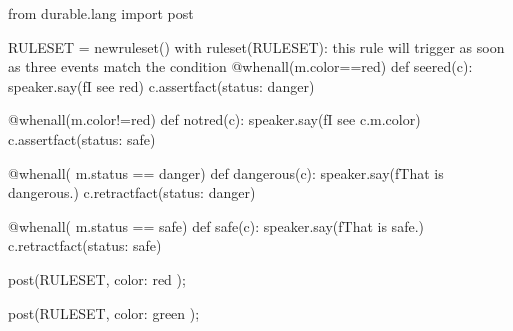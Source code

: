\documentclass[letterpaper,10pt,english]{sphinxmanual}
\begin{document}
{
\begin{sphinxVerbatim}[commandchars=\\\{\}]
\llap{\color{nbsphinxin}[ ]:\,\hspace{\fboxrule}\hspace{\fboxsep}}from durable.lang import post

RULESET = new\PYGZus{}ruleset()
with ruleset(RULESET):
    \PYGZsh{} this rule will trigger as soon as three events match the condition
    @when\PYGZus{}all(m.color==\PYGZsq{}red\PYGZsq{})
    def see\PYGZus{}red(c):
        speaker.say(f\PYGZsq{}I see red\PYGZsq{})
        c.assert\PYGZus{}fact(\PYGZob{}\PYGZsq{}status\PYGZsq{}: \PYGZsq{}danger\PYGZsq{}\PYGZcb{})

    @when\PYGZus{}all(m.color!=\PYGZsq{}red\PYGZsq{})
    def not\PYGZus{}red(c):
        speaker.say(f\PYGZsq{}I see \PYGZob{}c.m.color\PYGZcb{}\PYGZsq{})
        c.assert\PYGZus{}fact(\PYGZob{}\PYGZsq{}status\PYGZsq{}: \PYGZsq{}safe\PYGZsq{}\PYGZcb{})

    @when\PYGZus{}all( m.status == \PYGZsq{}danger\PYGZsq{})
    def dangerous(c):
        speaker.say(f\PYGZsq{}That is dangerous.\PYGZsq{})
        c.retract\PYGZus{}fact(\PYGZob{}\PYGZsq{}status\PYGZsq{}: \PYGZsq{}danger\PYGZsq{}\PYGZcb{})

    @when\PYGZus{}all( m.status == \PYGZsq{}safe\PYGZsq{})
    def safe(c):
        speaker.say(f\PYGZsq{}That is safe.\PYGZsq{})
        c.retract\PYGZus{}fact(\PYGZob{}\PYGZsq{}status\PYGZsq{}: \PYGZsq{}safe\PYGZsq{}\PYGZcb{})

\end{sphinxVerbatim}
}

{
\begin{sphinxVerbatim}[commandchars=\\\{\}]
\llap{\color{nbsphinxin}[ ]:\,\hspace{\fboxrule}\hspace{\fboxsep}}post(RULESET, \PYGZob{}\PYGZsq{}color\PYGZsq{}: \PYGZsq{}red\PYGZsq{} \PYGZcb{});
\end{sphinxVerbatim}
}

{
\begin{sphinxVerbatim}[commandchars=\\\{\}]
\llap{\color{nbsphinxin}[ ]:\,\hspace{\fboxrule}\hspace{\fboxsep}}post(RULESET, \PYGZob{}\PYGZsq{}color\PYGZsq{}: \PYGZsq{}green\PYGZsq{} \PYGZcb{});
\end{sphinxVerbatim}
}
\end{document}
